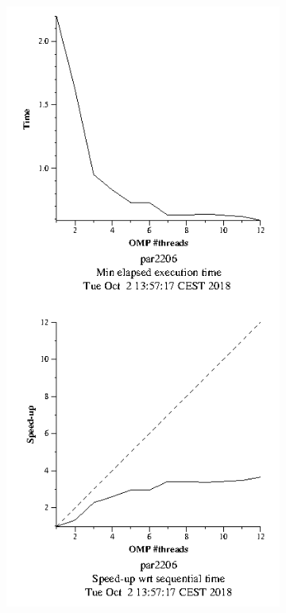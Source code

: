\documentclass{article}
\begin{document}
\newpage
\begin{figure}[htbp]
    \centering
    \begin{subfigure}[b]{0.35\textwidth}                                        \includegraphics[width=\textwidth]{strongoverhead.png}

\end{subfigure}
\end{figure}
\end{document}
